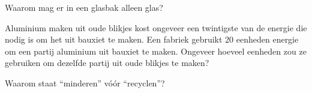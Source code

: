 \begin{exercise}[$\star$]\label{exo:g5:raw-materials-and-recycling:9}
Waarom mag er in een glasbak alleen glas?
\end{exercise}

\begin{exercise}[$\star\star$]\label{exo:g5:raw-materials-and-recycling:10}
Aluminium maken uit oude blikjes kost ongeveer een twintigste van de
energie die nodig is om het uit bauxiet te maken. Een fabriek gebruikt
20 eenheden energie om een partij aluminium uit bauxiet te maken.
Ongeveer hoeveel eenheden zou ze gebruiken om dezelfde partij uit oude
blikjes te maken?
\end{exercise}

\begin{exercise}[$\star\star$]\label{exo:g5:raw-materials-and-recycling:11}
Waarom staat ``minderen'' vóór ``recyclen''?
\end{exercise}
